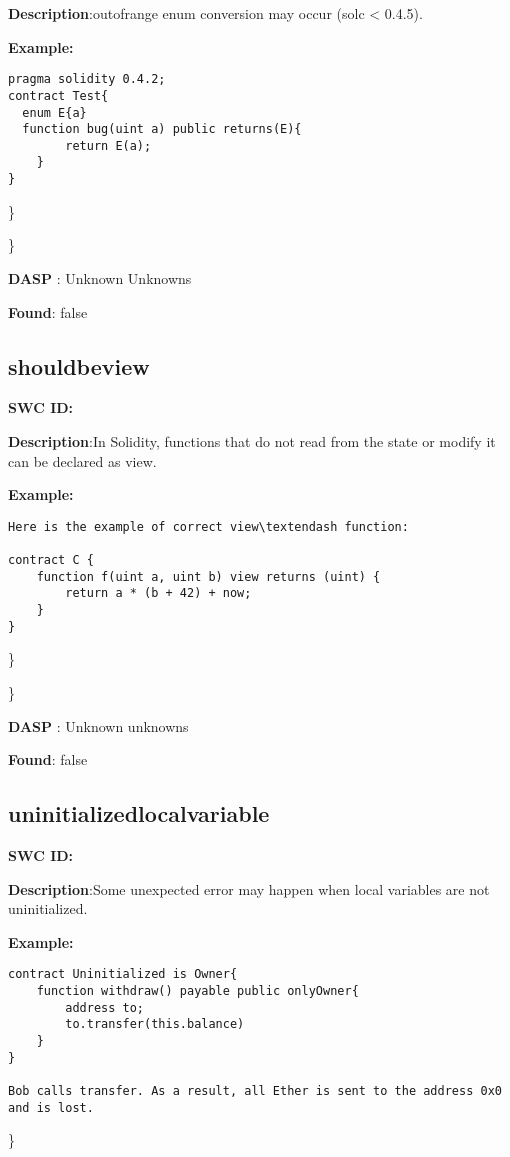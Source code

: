 \documentclass{article}
\begin{document}
\textbf{Description}:out\textendash of\textendash range enum conversion may occur (solc < 0.4.5).


\textbf{Example:} 
\begin{verbatim}
pragma solidity 0.4.2;
contract Test{
  enum E{a}
  function bug(uint a) public returns(E){
        return E(a);
    }
}

\end{verbatim}\} 

\} 

\textbf{DASP} : Unknown Unknowns

\textbf{Found}: false

\subsection{should\textunderscore be\textunderscore view} 
\textbf{SWC \textunderscore ID:} 

\textbf{Description}:In Solidity, functions that do not read from the state or modify it can be declared as view.


\textbf{Example:} 
\begin{verbatim}
Here is the example of correct view\textendash function:

contract C {
    function f(uint a, uint b) view returns (uint) {
        return a * (b + 42) + now;
    }
}

\end{verbatim}\} 

\} 

\textbf{DASP} : Unknown unknowns

\textbf{Found}: false

\subsection{uninitialized\textunderscore local\textunderscore variable} 
\textbf{SWC \textunderscore ID:} 

\textbf{Description}:Some unexpected error may happen when local variables are not uninitialized.


\textbf{Example:} 
\begin{verbatim}
contract Uninitialized is Owner{
    function withdraw() payable public onlyOwner{
        address to;
        to.transfer(this.balance)
    }
}

Bob calls transfer. As a result, all Ether is sent to the address 0x0 and is lost.

\end{verbatim}\} 
\end{document}
